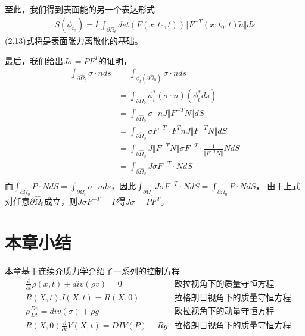 至此，我们得到表面能的另一个表达形式
\begin{equation}
    \begin{split}
        S(\phi_{t_0}) = k \int_{\partial \Omega_t} det(F(x;t_0,t)) \Vert F^{-T}(x;t_0,t)\tilde{n}\Vert d\tilde{s}
    \end{split}
\end{equation}
(2.13)式将是表面张力离散化的基础。

最后，我们给出$J\sigma = PF^{T}$的证明，
\begin{align*}
    \int_{\partial \hat{\Omega}_{t}} \sigma \cdot n ds &= \int_{\phi_t (\partial \hat{\Omega}_{0})} \sigma\cdot n ds\\
    &= \int_{\partial \hat{\Omega}_0} \phi_t^*(\sigma\cdot n) (\phi_t^* ds)\\
    &= \int_{\partial \hat{\Omega}_0} \sigma\cdot n J \Vert F^{-T} N\Vert dS\\
    &= \int_{\partial \hat{\Omega}_0} \sigma F^{-T} \cdot F^{T}n J \Vert F^{-T} N\Vert dS\\
    &= \int_{\partial \hat{\Omega}_0} J\Vert F^{-T} N\Vert\sigma F^{-T} \cdot \frac{1}{\Vert F^{-T}N \Vert} N dS\\
    &= \int_{\partial \hat{\Omega}_0} J\sigma F^{-T} \cdot　N dS\\
\end{align*}
而$\int_{\partial \hat{\Omega}_{0}} P \cdot N dS = \int_{\partial \hat{\Omega}_{t}} \sigma \cdot n ds$，因此$\int_{\partial \hat{\Omega}_0} J\sigma F^{-T} \cdot　N dS = \int_{\partial \hat{\Omega}_0} P \cdot　N dS$，
由于上式对任意$\partial \hat{\Omega}_0$成立，则$J\sigma F^{-T}= P$得$J\sigma = PF^{T}$。


\section{本章小结}
本章基于连续介质力学介绍了一系列的控制方程
\begin{align*}
    &\frac{\partial}{\partial t}\rho (x,t) + div(\rho v) = 0 & \text{欧拉视角下的质量守恒方程} \\
    &R(X,t)J(X,t) = R(X,0) & \text{拉格朗日视角下的质量守恒方程} \\
    &\rho \frac{Dv}{Dt} = div(\sigma) + \rho g & \text{欧拉视角下的动量守恒方程}\\
    &R(X,0)\frac{\partial}{\partial t} V(X,t) = DIV(P) + Rg &\text{拉格朗日视角下的质量守恒方程}
\end{align*}

